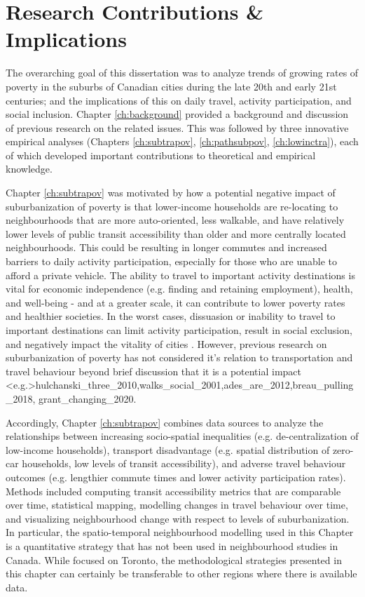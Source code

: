 
\section{Research Contributions \& Implications}

The overarching goal of this dissertation was to analyze trends of growing rates of poverty in the suburbs of Canadian cities during the late 20th and early 21st centuries; and the implications of this on daily travel, activity participation, and social inclusion. Chapter \ref{ch:background} provided a background and discussion of previous research on the related issues. This was followed by three innovative empirical analyses (Chapters \ref{ch:subtrapov}, \ref{ch:pathsubpov}, \ref{ch:lowinctra}), each of which developed important contributions to theoretical and empirical knowledge.

Chapter \ref{ch:subtrapov} was motivated by how a potential negative impact of suburbanization of poverty is that lower-income households are re-locating to neighbourhoods that are more auto-oriented, less walkable, and have relatively lower levels of public transit accessibility than older and more centrally located neighbourhoods. This could be resulting in longer commutes and increased barriers to daily activity participation, especially for those who are unable to afford a private vehicle. The ability to travel to important activity destinations is vital for economic independence (e.g. finding and retaining employment), health, and well-being - and at a greater scale, it can contribute to lower poverty rates and healthier societies. In the worst cases, dissuasion or inability to travel to important destinations can limit activity participation, result in social exclusion, and negatively impact the vitality of cities \cite{lucas_transport_2012,martens_transport_2016}. However, previous research on suburbanization of poverty has not considered it's relation to transportation and travel behaviour beyond brief discussion that it is a potential impact \shortcite<e.g.>{hulchanski_three_2010,walks_social_2001,ades_are_2012,breau_pulling_2018, grant_changing_2020}. 

Accordingly, Chapter \ref{ch:subtrapov} combines data sources to analyze the relationships between increasing socio-spatial inequalities (e.g. de-centralization of low-income households), transport disadvantage (e.g. spatial distribution of zero-car households, low levels of transit accessibility), and adverse travel behaviour outcomes (e.g. lengthier commute times and lower activity participation rates). Methods included computing transit accessibility metrics that are comparable over time, statistical mapping, modelling changes in travel behaviour over time, and visualizing neighbourhood change with respect to levels of suburbanization. In particular, the spatio-temporal neighbourhood modelling used in this Chapter is a quantitative strategy that has not been used in neighbourhood studies in Canada. While focused on Toronto, the methodological strategies presented in this chapter can certainly be transferable to other regions where there is available data.

